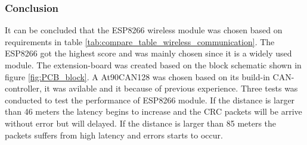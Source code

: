 \subsubsection*{Conclusion}
It can be concluded that the ESP8266 wireless module was chosen based on requirements in table \ref{tab:compare_table_wireless_communication}. The ESP8266 got the highest score and was mainly chosen since it is a widely used module. The extension-board was created based on the block schematic shown in figure \ref{fig:PCB_block}. A At90CAN128 was chosen based on its build-in CAN-controller, it was avilable and it because of previous experience. Three tests was conducted to test the performance of ESP8266 module. If the distance is larger than 46 meters the latency begins to increase and the CRC packets will be arrive without error but will delayed. If the distance is larger than 85 meters the packets suffers from high latency and errors starts to occur.


